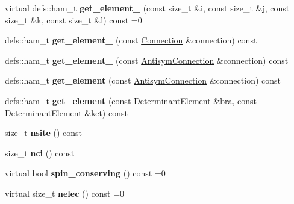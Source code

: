 \begin{DoxyCompactItemize}
\item 
virtual defs\+::ham\+\_\+t {\bfseries get\+\_\+element\+\_} (const size\+\_\+t \&i, const size\+\_\+t \&j, const size\+\_\+t \&k, const size\+\_\+t \&l) const =0\hypertarget{classHamiltonian_a85cb450f38fb23fcf415c6799c1a661f}{}\label{classHamiltonian_a85cb450f38fb23fcf415c6799c1a661f}

\item 
defs\+::ham\+\_\+t {\bfseries get\+\_\+element\+\_} (const \hyperlink{classConnection}{Connection} \&connection) const \hypertarget{classHamiltonian_a15912ad8b283d9ee745f3c2d21a32c40}{}\label{classHamiltonian_a15912ad8b283d9ee745f3c2d21a32c40}

\item 
defs\+::ham\+\_\+t {\bfseries get\+\_\+element\+\_} (const \hyperlink{classAntisymConnection}{Antisym\+Connection} \&connection) const \hypertarget{classHamiltonian_a667e1f7676d5e1e34bb38a4533673f3e}{}\label{classHamiltonian_a667e1f7676d5e1e34bb38a4533673f3e}

\item 
defs\+::ham\+\_\+t {\bfseries get\+\_\+element} (const \hyperlink{classAntisymConnection}{Antisym\+Connection} \&connection) const \hypertarget{classHamiltonian_a2d83c983c71f6dbb10218c7d303fb261}{}\label{classHamiltonian_a2d83c983c71f6dbb10218c7d303fb261}

\item 
defs\+::ham\+\_\+t {\bfseries get\+\_\+element} (const \hyperlink{classDeterminantElement}{Determinant\+Element} \&bra, const \hyperlink{classDeterminantElement}{Determinant\+Element} \&ket) const \hypertarget{classHamiltonian_a351f134025885998d632c86227f1da15}{}\label{classHamiltonian_a351f134025885998d632c86227f1da15}

\item 
size\+\_\+t {\bfseries nsite} () const \hypertarget{classHamiltonian_a4e12daf4f223b7ff2c82078a709aabac}{}\label{classHamiltonian_a4e12daf4f223b7ff2c82078a709aabac}

\item 
size\+\_\+t {\bfseries nci} () const \hypertarget{classHamiltonian_a7ec2da6325e8eda1023f67d63c8c0a35}{}\label{classHamiltonian_a7ec2da6325e8eda1023f67d63c8c0a35}

\item 
virtual bool {\bfseries spin\+\_\+conserving} () const =0\hypertarget{classHamiltonian_ac74a988992ec2108d1fd0ef4455c810c}{}\label{classHamiltonian_ac74a988992ec2108d1fd0ef4455c810c}

\item 
virtual size\+\_\+t {\bfseries nelec} () const =0\hypertarget{classHamiltonian_a6fad47832ce13f6b36232f4c653aa04f}{}\label{classHamiltonian_a6fad47832ce13f6b36232f4c653aa04f}


\end{DoxyCompactItemize}
